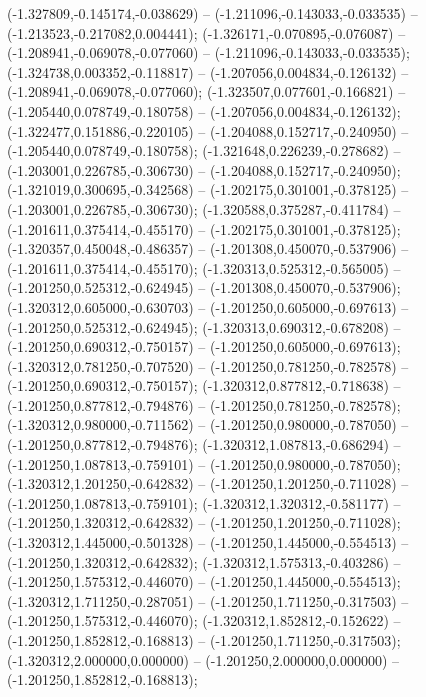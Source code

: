  (-1.327809,-0.145174,-0.038629) -- (-1.211096,-0.143033,-0.033535) -- (-1.213523,-0.217082,0.004441);
 (-1.326171,-0.070895,-0.076087) -- (-1.208941,-0.069078,-0.077060) -- (-1.211096,-0.143033,-0.033535);
 (-1.324738,0.003352,-0.118817) -- (-1.207056,0.004834,-0.126132) -- (-1.208941,-0.069078,-0.077060);
 (-1.323507,0.077601,-0.166821) -- (-1.205440,0.078749,-0.180758) -- (-1.207056,0.004834,-0.126132);
 (-1.322477,0.151886,-0.220105) -- (-1.204088,0.152717,-0.240950) -- (-1.205440,0.078749,-0.180758);
 (-1.321648,0.226239,-0.278682) -- (-1.203001,0.226785,-0.306730) -- (-1.204088,0.152717,-0.240950);
 (-1.321019,0.300695,-0.342568) -- (-1.202175,0.301001,-0.378125) -- (-1.203001,0.226785,-0.306730);
 (-1.320588,0.375287,-0.411784) -- (-1.201611,0.375414,-0.455170) -- (-1.202175,0.301001,-0.378125);
 (-1.320357,0.450048,-0.486357) -- (-1.201308,0.450070,-0.537906) -- (-1.201611,0.375414,-0.455170);
 (-1.320313,0.525312,-0.565005) -- (-1.201250,0.525312,-0.624945) -- (-1.201308,0.450070,-0.537906);
 (-1.320312,0.605000,-0.630703) -- (-1.201250,0.605000,-0.697613) -- (-1.201250,0.525312,-0.624945);
 (-1.320313,0.690312,-0.678208) -- (-1.201250,0.690312,-0.750157) -- (-1.201250,0.605000,-0.697613);
 (-1.320312,0.781250,-0.707520) -- (-1.201250,0.781250,-0.782578) -- (-1.201250,0.690312,-0.750157);
 (-1.320312,0.877812,-0.718638) -- (-1.201250,0.877812,-0.794876) -- (-1.201250,0.781250,-0.782578);
 (-1.320312,0.980000,-0.711562) -- (-1.201250,0.980000,-0.787050) -- (-1.201250,0.877812,-0.794876);
 (-1.320312,1.087813,-0.686294) -- (-1.201250,1.087813,-0.759101) -- (-1.201250,0.980000,-0.787050);
 (-1.320312,1.201250,-0.642832) -- (-1.201250,1.201250,-0.711028) -- (-1.201250,1.087813,-0.759101);
 (-1.320312,1.320312,-0.581177) -- (-1.201250,1.320312,-0.642832) -- (-1.201250,1.201250,-0.711028);
 (-1.320312,1.445000,-0.501328) -- (-1.201250,1.445000,-0.554513) -- (-1.201250,1.320312,-0.642832);
 (-1.320312,1.575313,-0.403286) -- (-1.201250,1.575312,-0.446070) -- (-1.201250,1.445000,-0.554513);
 (-1.320312,1.711250,-0.287051) -- (-1.201250,1.711250,-0.317503) -- (-1.201250,1.575312,-0.446070);
 (-1.320312,1.852812,-0.152622) -- (-1.201250,1.852812,-0.168813) -- (-1.201250,1.711250,-0.317503);
 (-1.320312,2.000000,0.000000) -- (-1.201250,2.000000,0.000000) -- (-1.201250,1.852812,-0.168813);
